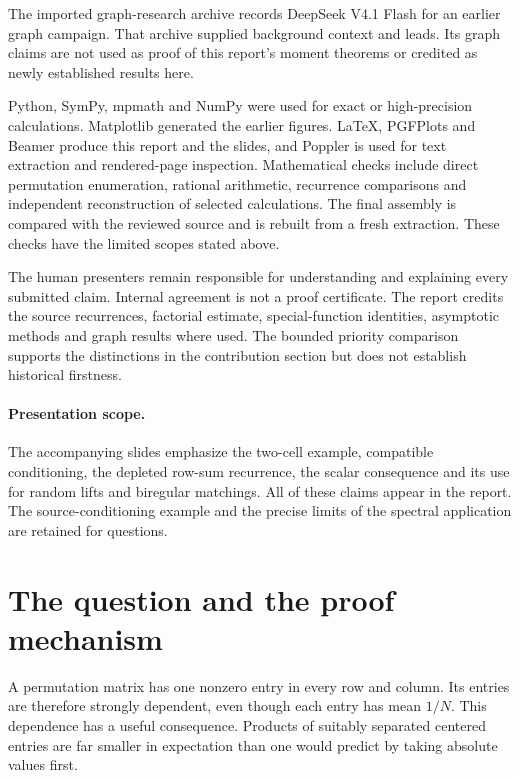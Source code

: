 \documentclass[11pt]{article}
\theoremstyle{definition}
\theoremstyle{remark}
\newcommand{\1}{\mathbf 1}
\begin{document}
The imported graph-research archive records DeepSeek V4.1 Flash for an earlier graph campaign. That archive supplied background context and leads. Its graph claims are not used as proof of this report's moment theorems or credited as newly established results here.

Python, SymPy, mpmath and NumPy were used for exact or high-precision calculations. Matplotlib generated the earlier figures. LaTeX, PGFPlots and Beamer produce this report and the slides, and Poppler is used for text extraction and rendered-page inspection. Mathematical checks include direct permutation enumeration, rational arithmetic, recurrence comparisons and independent reconstruction of selected calculations. The final assembly is compared with the reviewed source and is rebuilt from a fresh extraction. These checks have the limited scopes stated above.

The human presenters remain responsible for understanding and explaining every submitted claim. Internal agreement is not a proof certificate. The report credits the source recurrences, factorial estimate, special-function identities, asymptotic methods and graph results where used. The bounded priority comparison supports the distinctions in the contribution section but does not establish historical firstness.

\paragraph{Presentation scope.}
The accompanying slides emphasize the two-cell example, compatible conditioning, the depleted row-sum recurrence, the scalar consequence and its use for random lifts and biregular matchings. All of these claims appear in the report. The source-conditioning example and the precise limits of the spectral application are retained for questions.

\clearpage

\begingroup\small
\tableofcontents
\endgroup
\clearpage
\section{The question and the proof mechanism}

A permutation matrix has one nonzero entry in every row and column. Its entries are therefore strongly dependent, even though each entry has mean $1/N$. This dependence has a useful consequence. Products of suitably separated centered entries are far smaller in expectation than one would predict by taking absolute values first.
\end{document}
